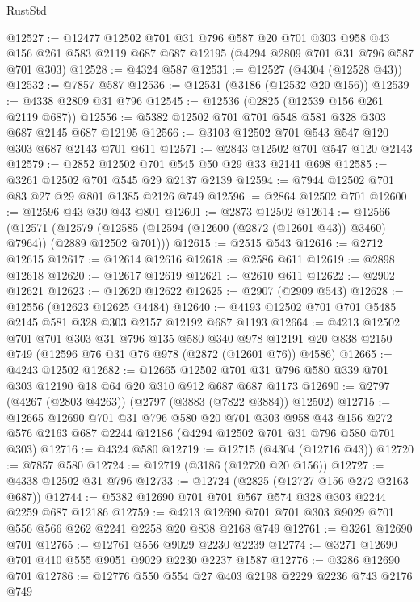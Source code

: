 \begin{lexlean}{RustStd}
\begin{coremodule}
@12527 := @12477
    @12502
    @701
    @31
    @796
    @587
    @20
    @701
    @303
    @958
    @43
    @156
    @261
    @583
    @2119
    @687
    @687
    @12195
    (@4294 @2809 @701 @31 @796 @587 @701 @303)
@12528 := @4324 @587
@12531 := @12527 (@4304 (@12528 @43))
@12532 := @7857 @587
@12536 := @12531 (@3186 (@12532 @20 @156))
@12539 := @4338 @2809 @31 @796
@12545 := @12536 (@2825 (@12539 @156 @261 @2119 @687))
@12556 := @5382 @12502 @701 @701 @548 @581 @328 @303 @687 @2145 @687 @12195
@12566 := @3103 @12502 @701 @543 @547 @120 @303 @687 @2143 @701 @611
@12571 := @2843 @12502 @701 @547 @120 @2143
@12579 := @2852 @12502 @701 @545 @50 @29 @33 @2141 @698
@12585 := @3261 @12502 @701 @545 @29 @2137 @2139
@12594 := @7944 @12502 @701 @83 @27 @29 @801 @1385 @2126 @749
@12596 := @2864 @12502 @701
@12600 := @12596 @43 @30 @43 @801
@12601 := @2873 @12502
@12614 := @12566
    (@12571
      (@12579 (@12585 (@12594 (@12600 (@2872 (@12601 @43)) @3460) @7964)) (@2889 @12502 @701)))
@12615 := @2515 @543
@12616 := @2712 @12615
@12617 := @12614 @12616
@12618 := @2586 @611
@12619 := @2898 @12618
@12620 := @12617 @12619
@12621 := @2610 @611
@12622 := @2902 @12621
@12623 := @12620 @12622
@12625 := @2907 (@2909 @543)
@12628 := @12556 (@12623 @12625 @4484)
@12640 := @4193 @12502 @701 @701 @5485 @2145 @581 @328 @303 @2157 @12192 @687 @1193
@12664 := @4213
    @12502
    @701
    @701
    @303
    @31
    @796
    @135
    @580
    @340
    @978
    @12191
    @20
    @838
    @2150
    @749
    (@12596 @76 @31 @76 @978 (@2872 (@12601 @76)) @4586)
@12665 := @4243 @12502
@12682 := @12665
    @12502
    @701
    @31
    @796
    @580
    @339
    @701
    @303
    @12190
    @18
    @64
    @20
    @310
    @912
    @687
    @687
    @1173
@12690 := @2797 (@4267 (@2803 @4263)) (@2797 (@3883 (@7822 @3884)) @12502)
@12715 := @12665
    @12690
    @701
    @31
    @796
    @580
    @20
    @701
    @303
    @958
    @43
    @156
    @272
    @576
    @2163
    @687
    @2244
    @12186
    (@4294 @12502 @701 @31 @796 @580 @701 @303)
@12716 := @4324 @580
@12719 := @12715 (@4304 (@12716 @43))
@12720 := @7857 @580
@12724 := @12719 (@3186 (@12720 @20 @156))
@12727 := @4338 @12502 @31 @796
@12733 := @12724 (@2825 (@12727 @156 @272 @2163 @687))
@12744 := @5382 @12690 @701 @701 @567 @574 @328 @303 @2244 @2259 @687 @12186
@12759 := @4213 @12690 @701 @701 @303 @9029 @701 @556 @566 @262 @2241 @2258 @20 @838 @2168 @749
@12761 := @3261 @12690 @701
@12765 := @12761 @556 @9029 @2230 @2239
@12774 := @3271 @12690 @701 @410 @555 @9051 @9029 @2230 @2237 @1587
@12776 := @3286 @12690 @701
@12786 := @12776 @550 @554 @27 @403 @2198 @2229 @2236 @743 @2176 @749

\end{coremodule}
\end{lexlean}
